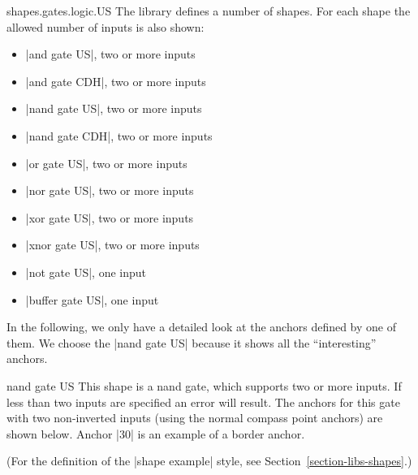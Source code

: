 \begin{pgflibrary}{shapes.gates.logic.US}
    The library defines a number of shapes. For each shape the allowed number
    of inputs is also shown:
    \begin{itemize}
        \item |and gate US|, two or more inputs
        \item |and gate CDH|, two or more inputs
        \item |nand gate US|, two or more inputs
        \item |nand gate CDH|, two or more inputs
        \item |or gate US|, two or more inputs
        \item |nor gate US|, two or more inputs
        \item |xor gate US|, two or more inputs
        \item |xnor gate US|, two or more inputs
        \item |not gate US|, one input
        \item |buffer gate US|, one input
    \end{itemize}

    In the following, we only have a detailed look at the anchors defined by
    one of them. We choose the |nand gate US| because it shows all the
    ``interesting'' anchors.

    \begin{shape}{nand gate US}
        This shape is a nand gate, which supports two or more inputs. If less
        than two inputs are specified an error will result. The anchors for
        this gate with two non-inverted inputs (using the normal compass point
        anchors) are shown below. Anchor |30| is an example of a border anchor.
\begin{codeexample}[preamble={\usetikzlibrary{circuits.logic.US}}]
\Huge
{}
\end{codeexample}

        (For the definition of the |shape example| style, see
        Section~\ref{section-libs-shapes}.)
    \end{shape}
\end{pgflibrary}


